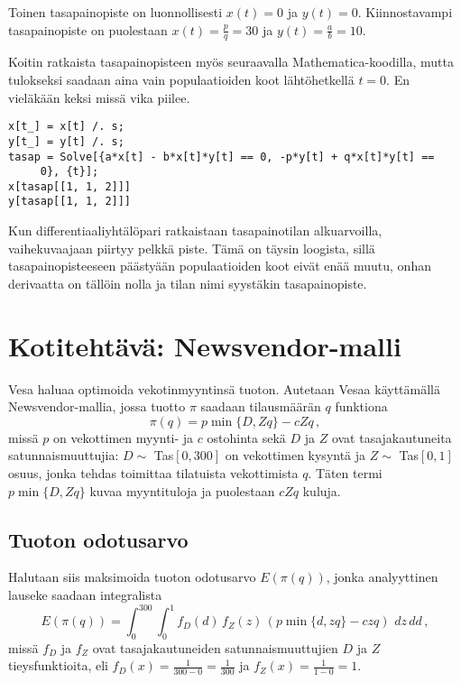 \documentclass[a4paper,11pt]{article}
\begin{document}
{Toinen tasapainopiste on luonnollisesti $x(t)=0$ ja $y(t)=0$. Kiinnostavampi tasapainopiste on puolestaan $x(t)=\frac{p}{q}=30$ ja $y(t)=\frac{a}{b}=10$.

Koitin ratkaista tasapainopisteen myös seuraavalla Mathematica-koodilla, mutta tulokseksi saadaan aina vain populaatioiden koot lähtöhetkellä $t=0$. En vieläkään keksi missä vika piilee.
\begin{lstlisting}
x[t_] = x[t] /. s;
y[t_] = y[t] /. s;
tasap = Solve[{a*x[t] - b*x[t]*y[t] == 0, -p*y[t] + q*x[t]*y[t] == 
     0}, {t}];
x[tasap[[1, 1, 2]]]
y[tasap[[1, 1, 2]]]
\end{lstlisting}

Kun differentiaaliyhtälöpari ratkaistaan tasapainotilan alkuarvoilla, vaihekuvaajaan piirtyy pelkkä piste. Tämä on täysin loogista, sillä tasapainopisteeseen päästyään populaatioiden koot eivät enää muutu, onhan derivaatta on tällöin nolla ja tilan nimi syystäkin tasapainopiste.

\section{Kotitehtävä: Newsvendor-malli}

Vesa haluaa optimoida vekotinmyyntinsä tuoton. Autetaan Vesaa käyttämällä Newsvendor-mallia, jossa tuotto $\pi$ saadaan tilausmäärän $q$ funktiona 
\begin{equation}
    \pi(q) = p \min \{D,Zq\} - cZq\,,
\end{equation}
missä $p$ on vekottimen myynti- ja $c$ ostohinta sekä $D$ ja $Z$ ovat tasajakautuneita satunnaismuuttujia: $D\sim$ Tas$[0,300]$ on vekottimen kysyntä ja $Z\sim$ Tas$[0,1]$ osuus, jonka tehdas toimittaa tilatuista vekottimista $q$. Täten termi $p \min \{D,Zq\}$ kuvaa myyntituloja ja puolestaan $cZq$ kuluja.

\subsection{Tuoton odotusarvo}

Halutaan siis maksimoida tuoton odotusarvo $E(\pi(q))$, jonka analyyttinen lauseke saadaan integralista
\begin{equation}
    E(\pi(q)) = \int_0^{300} \int_0^1 f_D(d)\,f_Z(z)\,(p \min \{d,zq\} - czq)\,\,dz\,dd\,,
\end{equation}
missä $f_D$ ja $f_Z$ ovat tasajakautuneiden satunnaismuuttujien $D$ ja $Z$ tieysfunktioita, eli $f_D(x)=\frac{1}{300-0}=\frac{1}{300}$ ja $f_Z(x)=\frac{1}{1-0}=1$.

}
\end{document}
